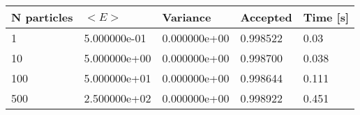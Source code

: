 \begin{table}[h!]
\begin{tabular}{|l|l|l|l|l|}
\hline 
N particles & $<E>$ & Variance & Accepted & Time [s]\\ 
 \hline 
1 & 5.000000e-01 & 0.000000e+00 & 0.998522 & 0.03 \\ \hline 
10 & 5.000000e+00 & 0.000000e+00 & 0.998700 & 0.038 \\ \hline 
100 & 5.000000e+01 & 0.000000e+00 & 0.998644 & 0.111 \\ \hline 
500 & 2.500000e+02 & 0.000000e+00 & 0.998922 & 0.451 \\ \hline 
\end{tabular}
\label{tab:ia1} 
\end{table} 
